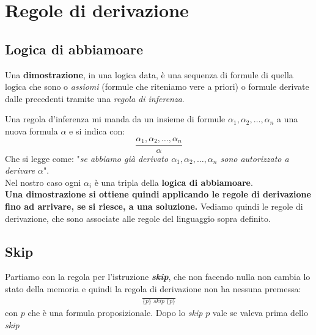 \section{Regole di derivazione}
\subsection{Logica di abbiamoare}
\begin{definizione}
	Una \textbf{dimostrazione}, in una logica data, è una sequenza di formule di
	quella logica che sono o \textit{assiomi} (formule che riteniamo vere a
	priori) o formule derivate dalle precedenti tramite una \textit{regola di
	inferenza}. 
\end{definizione} \vspace{5mm} %
Una regola d'inferenza mi manda da un insieme di formule
$\alpha_1,\alpha_2,\ldots,\alpha_n$ a una nuova formula $\alpha$ e si indica
con: 
\[\frac{\alpha_1,\alpha_2,\ldots,\alpha_n}{\alpha}\]
Che si legge come: "\textit{se abbiamo già derivato $\alpha_1, \alpha_2,
	\ldots,\alpha_n$ sono autorizzato a derivare $\alpha$}".\\ 
Nel nostro caso ogni $\alpha_i$ è una tripla della \textbf{logica di abbiamoare}.\\
\textbf{Una dimostrazione si ottiene quindi applicando le regole di derivazione fino
ad arrivare, se si riesce, a una soluzione.}
Vediamo quindi le regole di derivazione, che sono associate alle regole del
linguaggio sopra definito.
\subsection{Skip}
\begin{definizione}
	Partiamo con la regola per l'istruzione \textbf{\textit{skip}}, che non
	facendo nulla 
	non cambia lo stato della memoria e quindi la regola di derivazione non ha
	nessuna premessa:
	\begin{align}\label{SkipRule}
		\frac{}{\{p\}\,\, skip\,\,\{p\}} 
	\end{align}
	con $p$ che è una formula proposizionale. Dopo lo \textit{skip} $p$ vale se
	valeva prima dello \textit{skip}
\end{definizione} \vspace{5mm} %
